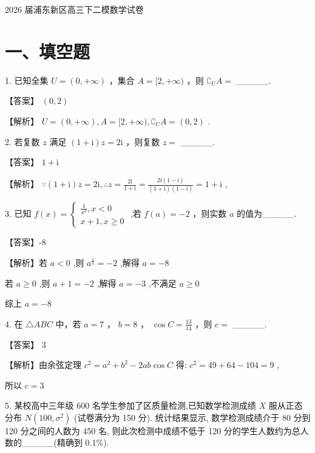 \documentclass[10pt]{article}
\begin{document}
2026 届浦东新区高三下二模数学试卷

\section*{一、填空题}

1. 已知全集 \(U = \left( {0, + \infty }\right)\) ，集合 \(A = \lbrack 2, + \infty )\) ，则 \({\complement }_{U}A =\) \_\_\_\_\_.

【答案】 \(\left( {0,2}\right)\)

【解析】 \(U = \left( {0, + \infty }\right) ,A = \lbrack 2, + \infty ),{\complement }_{U}A = \left( {0,2}\right)\) .

2. 若复数 \(z\) 满足 \(\left( {1 + \mathrm{i}}\right) z = {2\mathrm{i}}\) ，则复数 \(z =\) \_\_\_\_\_.

【答案】 \(1 + \mathrm{i}\)

【解析】 \(\because \left( {1 + \mathrm{i}}\right) z = 2\mathrm{i},\therefore z = \frac{2\mathrm{i}}{1 + \mathrm{i}} = \frac{2\mathrm{i}\left( {1 - \mathrm{i}}\right) }{\left( {1 + \mathrm{i}}\right) \left( {1 - \mathrm{i}}\right) } = 1 + \mathrm{i}\) ,

3. 已知 \(f\left( x\right)  = \left\{  \begin{array}{l} \frac{1}{{x}^{3}},x < 0 \\  x + 1,x \geq  0 \end{array}\right.\) ,若 \(f\left( a\right)  =  - 2\) ，则实数 \(a\) 的值为\_\_\_\_\_.

【答案】-8

【解析】若 \(a < 0\) ,则 \({a}^{\frac{1}{3}} =  - 2\) ,解得 \(a =  - 8\)

若 \(a \geq  0\) ,则 \(a + 1 =  - 2\) ,解得 \(a =  - 3\) ,不满足 \(a \geq  0\)

综上 \(a =  - 8\)

4. 在 \(\bigtriangleup  {ABC}\) 中，若 \(a = 7\) ， \(b = 8\) ， \(\cos C = \frac{13}{14}\) ，则 \(c =\) \_\_\_\_\_.

【答案】 3

【解析】由余弦定理 \({c}^{2} = {a}^{2} + {b}^{2} - {2ab}\cos C\) 得: \({c}^{2} = {49} + {64} - {104} = 9\) ,

所以 \(c = 3\)

5. 某校高中三年级 600 名学生参加了区质量检测,已知数学检测成绩 \(X\) 服从正态分布 \(N\left( {{100},{\sigma }^{2}}\right)\) (试卷满分为 150 分). 统计结果显示, 数学检测成绩介于 80 分到 120 分之间的人数为 450 名, 则此次检测中成绩不低于 120 分的学生人数约为总人数的\_\_\_\_\_(精确到 0.1\%).
\end{document}
